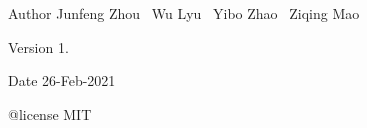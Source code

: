 \begin{DoxyAuthor}{Author}
Junfeng Zhou~\newline
 Wu Lyu~\newline
 Yibo Zhao~\newline
 Ziqing Mao
\end{DoxyAuthor}
\begin{DoxyVersion}{Version}
1.
\end{DoxyVersion}
\begin{DoxyDate}{Date}
26-\/Feb-\/2021
\end{DoxyDate}
@license MIT 